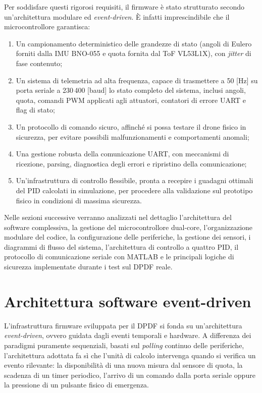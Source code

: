 \documentclass[11pt]{report}
\begin{document}
Per soddisfare questi rigorosi requisiti, il firmware è stato strutturato secondo un'architettura modulare ed \textit{event-driven}. È infatti imprescindibile che il microcontrollore garantisca:
\begin{enumerate}
    \item Un campionamento deterministico delle grandezze di stato (angoli di Eulero forniti dalla IMU BNO-055 e quota fornita dal ToF VL53L1X), con \textit{jitter} di fase contenuto;
    \item Un sistema di telemetria ad alta frequenza, capace di trasmettere a 50 [Hz] su porta seriale a 230\,400 [baud] lo stato completo del sistema, inclusi angoli, quota, comandi PWM applicati agli attuatori, contatori di errore UART e flag di stato;
    \item Un protocollo di comando sicuro, affinché si possa testare il drone fisico in sicurezza, per evitare possibili malfunzionamenti e comportamenti anomali;
    \item Una gestione robusta della comunicazione UART, con meccanismi di ricezione, parsing, diagnostica degli errori e ripristino della comunicazione;
    \item Un'infrastruttura di controllo flessibile, pronta a recepire i guadagni ottimali del PID calcolati in simulazione, per procedere alla validazione sul prototipo fisico in condizioni di massima sicurezza.
\end{enumerate}

Nelle sezioni successive verranno analizzati nel dettaglio l'architettura del software complessiva, la gestione del microcontrollore dual-core, l'organizzazione modulare del codice, la configurazione delle periferiche, la gestione dei sensori, i diagrammi di flusso del sistema, l'architettura di controllo a quattro PID, il protocollo di comunicazione seriale con MATLAB e le principali logiche di sicurezza implementate durante i test sul DPDF reale.

\section{Architettura software event-driven}
L'infrastruttura firmware sviluppata per il DPDF si fonda su un'architettura \textit{event-driven}, ovvero guidata dagli eventi temporali e hardware. A differenza dei paradigmi puramente sequenziali, basati sul \textit{polling} continuo delle periferiche, l'architettura adottata fa sì che l'unità di calcolo intervenga quando si verifica un evento rilevante: la disponibilità di una nuova misura dal sensore di quota, la scadenza di un timer periodico, l'arrivo di un comando dalla porta seriale oppure la pressione di un pulsante fisico di emergenza.
\end{document}
